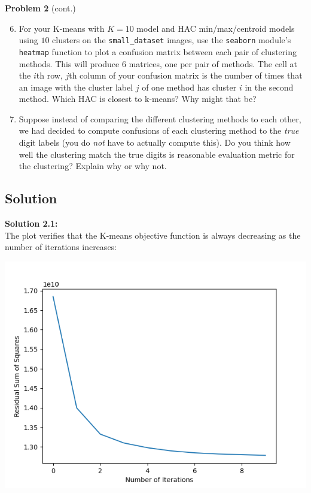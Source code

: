 \documentclass[submit]{harvardml}
\begin{document}
\newpage
\begin{framed}
\noindent\textbf{Problem 2} (cont.)\\
\begin{enumerate}
\setcounter{enumi}{5}
\item For your K-means with $K = 10$ model and HAC min/max/centroid
  models using $10$ clusters on the \texttt{small\_dataset} images,
  use the \texttt{seaborn} module's \texttt{heatmap} function to plot
  a confusion matrix between each pair of clustering methods.  This
  will produce 6 matrices, one per pair of methods. The cell at the
  $i$th row, $j$th column of your confusion matrix is the number of
  times that an image with the cluster label $j$ of one method has
  cluster $i$ in the second method.  Which HAC is closest to k-means?
  Why might that be?

\item Suppose instead of comparing the different clustering methods to
  each other, we had decided to compute confusions of each clustering
  method to the \emph{true} digit labels (you do \emph{not} have to
  actually compute this).  Do you think how well the clustering match
  the true digits is reasonable evaluation metric for the clustering?
  Explain why or why not.
  
\end{enumerate}
\end{framed}


\subsection*{Solution}
\noindent\textbf{Solution 2.1:}\\
The plot verifies that the K-means objective function is always decreasing as the number of iterations increases:
\begin{center}
    \includegraphics[scale=0.7]{2.1.png}
\end{center}
\newpage
\end{document}
